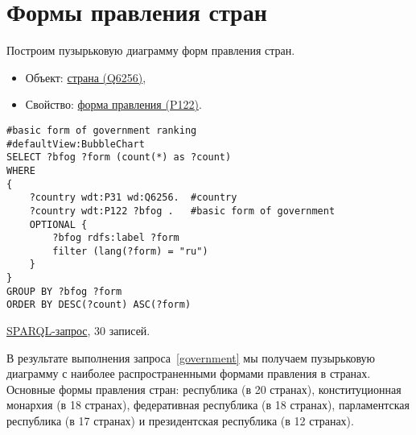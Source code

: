 \section{Формы правления стран}

Построим пузырьковую диаграмму форм правления стран.

\begin{itemize}
    \item Объект: \href{https://www.wikidata.org/wiki/Q6256}{страна (Q6256)},
    \item Свойство: \href{https://www.wikidata.org/wiki/Property:P122}{форма правления (P122)}.
\end{itemize}

\begin{lstlisting}[language=SPARQL language=SPARQL, label=government, caption=Пузырьковая диаграмма форм правления стран]
#basic form of government ranking
#defaultView:BubbleChart
SELECT ?bfog ?form (count(*) as ?count)
WHERE 
{
    ?country wdt:P31 wd:Q6256.  #country
    ?country wdt:P122 ?bfog .   #basic form of government
    OPTIONAL {
		?bfog rdfs:label ?form
		filter (lang(?form) = "ru")
	}
}
GROUP BY ?bfog ?form
ORDER BY DESC(?count) ASC(?form)
\end{lstlisting}

\href{https://query.wikidata.org/#%23basic%20form%20of%20government%20ranking%0A%23defaultView%3ABubbleChart%0ASELECT%20%3Fbfog%20%3Fform%20%28count%28%2a%29%20as%20%3Fcount%29%0AWHERE%20%0A%7B%0A%20%20%20%20%3Fcountry%20wdt%3AP31%20wd%3AQ6256.%0A%20%20%20%20%3Fcountry%20wdt%3AP122%20%3Fbfog%20.%0A%20%20%20%20OPTIONAL%20%7B%0A%09%09%3Fbfog%20rdfs%3Alabel%20%3Fform%0A%09%09filter%20%28lang%28%3Fform%29%20%3D%20%22ru%22%29%0A%09%7D%0A%7D%0AGROUP%20BY%20%3Fbfog%20%3Fform%0AORDER%20BY%20DESC%28%3Fcount%29%20ASC%28%3Fform%29}{SPARQL-запрос}, 30 записей.

В результате выполнения запроса~\ref{government} мы получаем пузырьковую диаграмму с наиболее распространенными формами правления в странах. 
Основные формы правления стран: республика (в 20 странах), конституционная монархия (в 18 странах), федеративная республика (в 18 странах), парламентская республика (в 17 странах) и президентская республика (в 12 странах).
